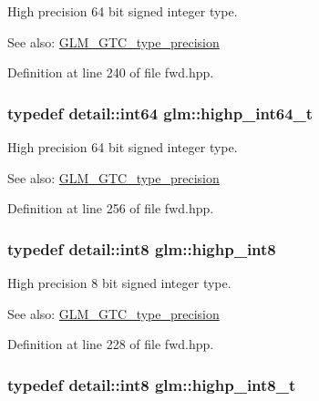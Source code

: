 High precision 64 bit signed integer type. \begin{Desc}
\item[See also:]\hyperlink{group__gtc__type__precision}{GLM\_\-GTC\_\-type\_\-precision} \end{Desc}


Definition at line 240 of file fwd.hpp.\hypertarget{group__gtc__type__precision_g0f5186bde44471133b08057cae8a51ac}{
\subsubsection[highp\_\-int64\_\-t]{\setlength{\rightskip}{0pt plus 5cm}typedef detail::int64 {\bf glm::highp\_\-int64\_\-t}}}
\label{group__gtc__type__precision_g0f5186bde44471133b08057cae8a51ac}


High precision 64 bit signed integer type. \begin{Desc}
\item[See also:]\hyperlink{group__gtc__type__precision}{GLM\_\-GTC\_\-type\_\-precision} \end{Desc}


Definition at line 256 of file fwd.hpp.\hypertarget{group__gtc__type__precision_g57c86999e666760c304453f9bfdc09d1}{
\subsubsection[highp\_\-int8]{\setlength{\rightskip}{0pt plus 5cm}typedef detail::int8 {\bf glm::highp\_\-int8}}}
\label{group__gtc__type__precision_g57c86999e666760c304453f9bfdc09d1}


High precision 8 bit signed integer type. \begin{Desc}
\item[See also:]\hyperlink{group__gtc__type__precision}{GLM\_\-GTC\_\-type\_\-precision} \end{Desc}


Definition at line 228 of file fwd.hpp.\hypertarget{group__gtc__type__precision_g417701b99e6e7992f35ab2ef694f88b2}{
\subsubsection[highp\_\-int8\_\-t]{\setlength{\rightskip}{0pt plus 5cm}typedef detail::int8 {\bf glm::highp\_\-int8\_\-t}}}
\label{group__gtc__type__precision_g417701b99e6e7992f35ab2ef694f88b2}



